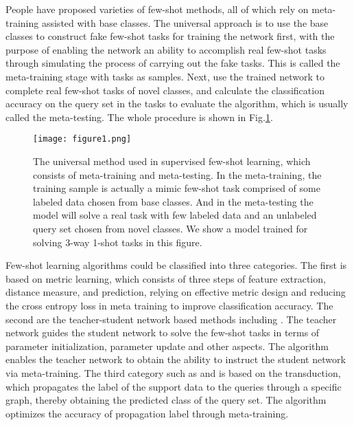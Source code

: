 \documentclass[conference]{IEEEtran}
\begin{document}
People have proposed varieties of few-shot methods, all of which rely on meta-training assisted with base classes. The universal approach is to use the base classes to construct fake few-shot tasks for training the network first, with the purpose of enabling the network an ability to accomplish real few-shot tasks through simulating the process of carrying out the fake tasks. This is called the meta-training stage with tasks as samples. Next, use the trained network to complete real few-shot tasks of novel classes, and calculate the classification accuracy on the query set in the tasks to evaluate the algorithm, which is usually called the meta-testing. The whole procedure is shown in Fig.\ref{fig1}.

\begin{figure}[htbp]
\centerline{\texttt{[image: figure1.png]}}
\caption{The universal method used in supervised few-shot learning, which consists of meta-training and meta-testing. In the meta-training, the training sample is actually a mimic few-shot task comprised of some labeled data chosen from base classes. And in the meta-testing the model will solve a real task with few labeled data and an unlabeled query set chosen from novel classes. We show a model trained for solving 3-way 1-shot tasks in this figure.}
\label{fig1}
\end{figure}
Few-shot learning algorithms could be classified into three categories. The first \cite{vinyals2016matching,snell2017prototypical,sung2018learning,oreshkin2018tadam} is based on metric learning, which consists of three steps of feature extraction, distance measure, and prediction, relying on effective metric design and reducing the cross entropy loss in meta training to improve classification accuracy. The second are the teacher-student network based methods including \cite{finn2017model,rusu2018meta,li2019lgm,ravi2016optimization}. The teacher network guides the student network to solve the few-shot tasks in terms of parameter initialization, parameter update and other aspects. The algorithm enables the teacher network to obtain the ability to instruct the student network via meta-training. The third category such as \cite{liu2018learning} and \cite{kim2019edge} is based on the transduction, which propagates the label of the support data to the queries through a specific graph, thereby obtaining the predicted class of the query set. The algorithm optimizes the accuracy of propagation label through meta-training.
\end{document}
